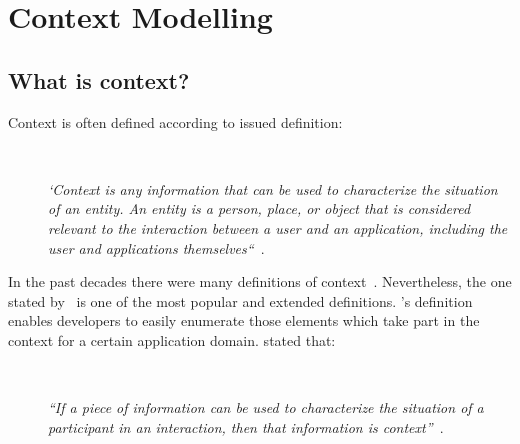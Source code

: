 \section{Context Modelling}
\label{sec:context}
\subsection{What is context?}
\label{sec:context_definition}

Context is often defined according to \citeauthor{dey_understanding_2001}
issued definition:

\begin{description}
  \item[] \hfill \\
  \begin{mdframed}[hidealllines=true,backgroundcolor=gray!20]
  \textit{`Context is any information that can be used to characterize the situation
  of an entity. An entity is a person, place, or object that is considered 
  relevant to the interaction between a user and an application, including the 
  user and applications themselves``}~\citep{dey_understanding_2001}.
  \end{mdframed}
\end{description}

In the past decades there were many definitions of context~\citep{adomavicius_context_aware_2011}.
Nevertheless, the one stated by~\citet{dey_understanding_2001} is one of the most
popular and extended definitions. \citeauthor{dey_understanding_2001}'s 
definition enables developers to easily enumerate those elements which take part 
in the context for a certain application domain. \citeauthor{dey_understanding_2001} stated that:

\begin{description}
  \item[] \hfill \\
  \begin{mdframed}[hidealllines=true,backgroundcolor=gray!20]
  \textit{``If a piece of information can be used to characterize the situation 
  of a participant in an interaction, then that information is context''~\citep{dey_understanding_2001}}.
  \end{mdframed}
\end{description}

